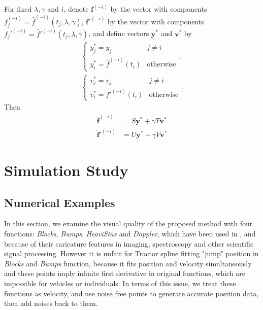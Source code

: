 \begin{lemma} \label{cvlemma}
For fixed $\lambda,\gamma$ and $i$, denote $\mathbf{f}^{(-i)}$ by the vector with components $f_j^{(-i)}=\hat{f}^{(-i)}(t_j,\lambda,\gamma)$,  $\mathbf{f}'^{(-i)}$ by the vector with components $f_j'^{(-i)}=\hat{f}'^{(-i)}(t_j,\lambda,\gamma)$, and define vectors $\mathbf{y}^*$ and $\mathbf{v}^*$ by 
\begin{align}
\begin{cases}
y_j^*=y_j &j \neq i\\
y_i^*=\hat{f}^{(-i)}(t_i) &\mbox{otherwise}
\end{cases},\\
\begin{cases}
v_j^*=v_j &j \neq i\\
v_i^*=\hat{f}'^{(-i)}(t_i) &\mbox{otherwise}
\end{cases}.
\end{align}
Then
\begin{align}
\mathbf{\hat{f}}^{(-i)}&=S\mathbf{y}^*+\gamma T\mathbf{v}^*\\
\mathbf{\hat{f}}'^{(-i)}&=U\mathbf{y}^*+\gamma V\mathbf{v}^*
\end{align}
\end{lemma}


\section{Simulation Study} %


\subsection{Numerical Examples}

In this section, we examine the visual quality of the proposed method with four functions: \textit{Blocks}, \textit{Bumps}, \textit{HeaviSine} and \textit{Doppler}, which have been used in \cite{donoho1994ideal}, \cite{donoho1995adapting} and \cite{abramovich1998wavelet} because of their caricature features in imaging, spectroscopy and other scientific signal processing. However it is unfair for Tractor spline fitting "jump" position in \textit{Blocks} and \textit{Bumps} function, because it fits position and velocity simultaneously and these points imply infinite first derivative in original functions, which are impossible for vehicles or individuals. In terms of this issue, we treat these functions as velocity, and use noise free points to generate accurate position data, then add noises back to them.

